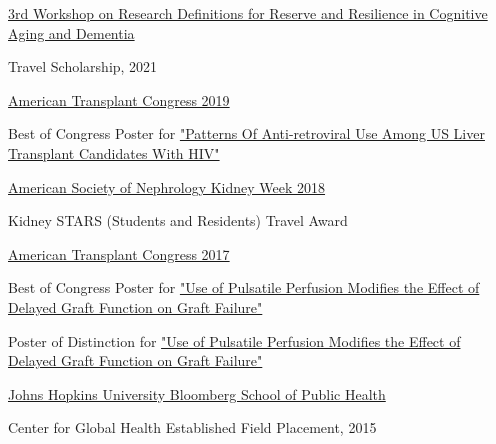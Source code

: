 \documentclass[10pt]{article}
\newcommand{\halfblankline}{\quad\vspace{-0.5\baselineskip}\pagebreak[3]}
\begin{document}
\halfblankline

\href{https://reserveandresilience.com/}{3rd Workshop on Research Definitions for Reserve and Resilience in Cognitive Aging and Dementia}
\begin{innerlist}
  \item Travel Scholarship, 2021
\end{innerlist}

\halfblankline

\href{http://atcmeeting.org/}{American Transplant Congress 2019}
\begin{innerlist}
\item Best of Congress Poster for
  \href{https://atcmeetingabstracts.com/abstract/patterns-of-anti-retroviral-use-among-u-s-liver-transplant-candidates-with-hiv/}
  {"Patterns Of Anti-retroviral Use Among US Liver Transplant Candidates With HIV"}
\end{innerlist}

\halfblankline

\href{https://www.asn-online.org/education/kidneyweek/}{American Society of Nephrology Kidney Week 2018}
\begin{innerlist}
\item Kidney STARS (Students and Residents) Travel Award
\end{innerlist}

\halfblankline

\href{http://atcmeeting.org/}{American Transplant Congress 2017}
\begin{innerlist}
\item Best of Congress Poster for
  \href{http://atcmeetingabstracts.com/abstract/use-of-pulsatile-perfusion-modifies-the-effect-of-delayed-graft-function-on-graft-failure/}
  {"Use of Pulsatile Perfusion Modifies the Effect of Delayed Graft Function on Graft Failure"}
\item Poster of Distinction for
  \href{http://atcmeetingabstracts.com/abstract/use-of-pulsatile-perfusion-modifies-the-effect-of-delayed-graft-function-on-graft-failure/}
  {"Use of Pulsatile Perfusion Modifies the Effect of Delayed Graft Function on Graft Failure"}
\end{innerlist}

\halfblankline

\href{http://www.jhsph.edu/}{Johns Hopkins University Bloomberg School of Public Health}
\begin{innerlist}
\item Center for Global Health Established Field Placement, 2015

\halfblankline

\end{innerlist}
\end{document}
